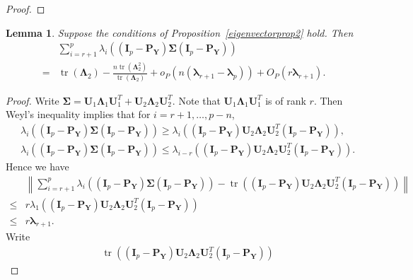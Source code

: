\documentclass[12pt]{article} %
\DeclareMathOperator{\mytr}{tr}
\newcommand{\bP}{\mathbf{P}}
\newcommand{\bY}{\mathbf{Y}}
\newcommand{\bI}{\mathbf{I}}
\newcommand{\bU}{\mathbf{U}}
\newcommand{\bfsym}[1]{\ensuremath{\boldsymbol{#1}}}
\def\blambda {\bfsym {\lambda}}
\def\bLambda {\bfsym {\Lambda}}
\def\bSigma {\bfsym {\Sigma}}
\newtheorem{lemma}{Lemma}
\theoremstyle{definition}
\begin{document}
\begin{appendices}
\begin{proof}
\end{proof}
\begin{lemma}
    Suppose the conditions of Proposition~\ref{eigenvectorprop2} hold.
    Then
\begin{equation*}
    \begin{split}
        &
        \sum_{i=r+1}^{p}\lambda_i\left(
         (\bI_p -\bP_\bY)\bSigma (\bI_p- \bP_{\bY})
    \right)
    \\
    =&\mytr(\bLambda_2)-\frac{n\mytr(\bLambda_2^2)}{\mytr(\bLambda_2)}
    +o_P\left(n(\blambda_{r+1}-\blambda_p)\right)
    +O_P\left(r\blambda_{r+1}\right)
    .
    \end{split}
\end{equation*}
\end{lemma}
\begin{proof}
    Write $\bSigma=\bU_1 \bLambda_1 \bU_1^T+\bU_2 \bLambda_2 \bU_2^T$.
    Note that $\bU_1 \bLambda_1 \bU_1^T$ is of rank $r$.
    Then Weyl's inequality implies that for $i=r+1,\ldots,p-n$, 
    \begin{align*}
    &\lambda_i \left(
         (\bI_p -\bP_\bY)\bSigma (\bI_p- \bP_{\bY})
    \right)
    \geq
    \lambda_i \left(
         (\bI_p -\bP_\bY)\bU_2 \bLambda_2 \bU_2^T (\bI_p- \bP_{\bY})
     \right),
     \\
     &
    \lambda_i \left(
         (\bI_p -\bP_\bY)\bSigma (\bI_p- \bP_{\bY})
    \right)
    \leq
    \lambda_{i-r} \left(
         (\bI_p -\bP_\bY)\bU_2 \bLambda_2 \bU_2^T (\bI_p- \bP_{\bY})
     \right).
    \end{align*}
    Hence we have
    \begin{equation}\label{jojo2}
        \begin{split}
        &\left\|
        \sum_{i=r+1}^{p}\lambda_i\left(
         (\bI_p -\bP_\bY)\bSigma (\bI_p- \bP_{\bY})
    \right)
    -
        \mytr\left(
         (\bI_p -\bP_\bY)\bU_2 \bLambda_2 \bU_2^T (\bI_p- \bP_{\bY})
    \right)
    \right\|
    \\
    \leq&
    r\lambda_1 \left(
         (\bI_p -\bP_\bY)\bU_2 \bLambda_2 \bU_2^T (\bI_p- \bP_{\bY})
    \right)
    \\
    \leq & r \blambda_{r+1}.
        \end{split}
    \end{equation}
    Write
    \begin{equation}\label{jojoa}
        \begin{split}
        &\mytr\left(
         (\bI_p -\bP_\bY)\bU_2 \bLambda_2 \bU_2^T (\bI_p- \bP_{\bY})
    \right)

\end{split}
\end{equation}
\end{proof}
\end{appendices}
\end{document}
